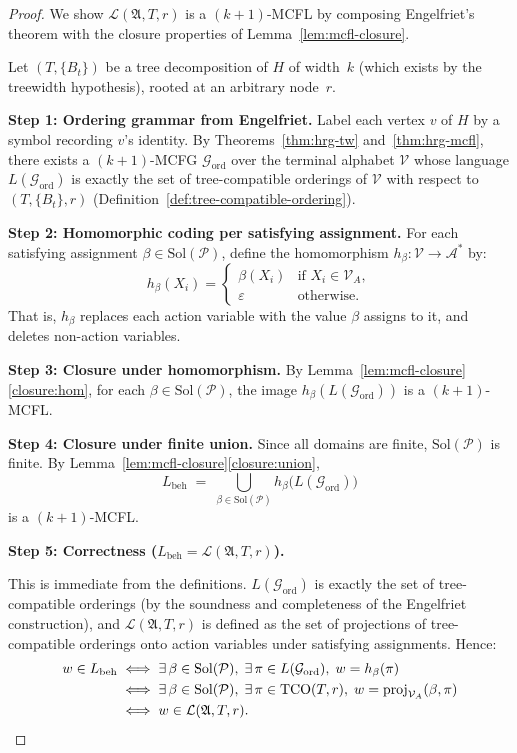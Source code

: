 \documentclass[11pt,a4paper]{article}
\theoremstyle{plain}
\theoremstyle{definition}
\theoremstyle{remark}
\begin{document}
\begin{proof}
We show $\mathcal{L}(\mathfrak{A}, T, r)$ is a $(k{+}1)$-MCFL by composing Engelfriet's theorem with the closure properties of Lemma~\ref{lem:mcfl-closure}.

Let $(T, \{B_t\})$ be a tree decomposition of $H$ of width~$k$ (which exists by the treewidth hypothesis), rooted at an arbitrary node~$r$.

\medskip
\noindent\textbf{Step 1: Ordering grammar from Engelfriet.}
Label each vertex $v$ of $H$ by a symbol recording $v$'s identity.
By Theorems~\ref{thm:hrg-tw} and~\ref{thm:hrg-mcfl}, there exists a $(k{+}1)$-MCFG $\mathcal{G}_{\mathrm{ord}}$ over the terminal alphabet $\mathcal{V}$ whose language $L(\mathcal{G}_{\mathrm{ord}})$ is exactly the set of tree-compatible orderings of $\mathcal{V}$ with respect to $(T, \{B_t\}, r)$ (Definition~\ref{def:tree-compatible-ordering}).

\medskip
\noindent\textbf{Step 2: Homomorphic coding per satisfying assignment.}
For each satisfying assignment $\beta \in \mathrm{Sol}(\mathcal{P})$, define the homomorphism $h_\beta\colon \mathcal{V} \to \mathcal{A}^*$ by:
\[
  h_\beta(X_i) = \begin{cases} \beta(X_i) & \text{if } X_i \in \mathcal{V}_A, \\ \varepsilon & \text{otherwise.} \end{cases}
\]
That is, $h_\beta$ replaces each action variable with the value $\beta$ assigns to it, and deletes non-action variables.

\medskip
\noindent\textbf{Step 3: Closure under homomorphism.}
By Lemma~\ref{lem:mcfl-closure}\ref{closure:hom}, for each $\beta \in \mathrm{Sol}(\mathcal{P})$, the image $h_\beta(L(\mathcal{G}_{\mathrm{ord}}))$ is a $(k{+}1)$-MCFL.

\medskip
\noindent\textbf{Step 4: Closure under finite union.}
Since all domains are finite, $\mathrm{Sol}(\mathcal{P})$ is finite.
By Lemma~\ref{lem:mcfl-closure}\ref{closure:union},
\[
  L_{\mathrm{beh}} \;=\; \bigcup_{\beta \in \mathrm{Sol}(\mathcal{P})} h_\beta\big(L(\mathcal{G}_{\mathrm{ord}})\big)
\]
is a $(k{+}1)$-MCFL.

\medskip
\noindent\textbf{Step 5: Correctness ($L_{\mathrm{beh}} = \mathcal{L}(\mathfrak{A}, T, r)$).}

This is immediate from the definitions.
$L(\mathcal{G}_{\mathrm{ord}})$ is exactly the set of tree-compatible orderings (by the soundness and completeness of the Engelfriet construction), and $\mathcal{L}(\mathfrak{A}, T, r)$ is defined as the set of projections of tree-compatible orderings onto action variables under satisfying assignments.
Hence:
\begin{align*}
  w \in L_{\mathrm{beh}} &\iff \exists\, \beta \in \mathrm{Sol}(\mathcal{P}),\; \exists\, \pi \in L(\mathcal{G}_{\mathrm{ord}}),\; w = h_\beta(\pi) \\
    &\iff \exists\, \beta \in \mathrm{Sol}(\mathcal{P}),\; \exists\, \pi \in \mathrm{TCO}(T, r),\; w = \mathrm{proj}_{\mathcal{V}_A}(\beta, \pi) \\
    &\iff w \in \mathcal{L}(\mathfrak{A}, T, r). \qedhere
\end{align*}
\end{proof}
\end{document}
